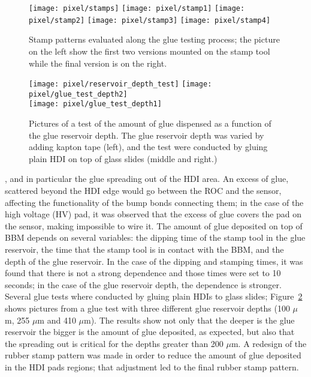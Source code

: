 \begin{figure}[!h]
  \centering  
  \texttt{[image: pixel/stamps]}
  \texttt{[image: pixel/stamp1]}
  \texttt{[image: pixel/stamp2]}
  \texttt{[image: pixel/stamp3]}
  \texttt{[image: pixel/stamp4]}
  \caption[Stamp patterns]{Stamp patterns evaluated along the glue testing process; the picture on the left show the first two versions mounted on the stamp tool while the final version is on the right.}\label{fig:stamp_pattern}
\end{figure}

\bit
  \begin{figure}[!h]
  \centering
  \texttt{[image: pixel/reservoir\_depth\_test]}
  \texttt{[image: pixel/glue\_test\_depth2]}\\
  \texttt{[image: pixel/glue\_test\_depth1]}
  \caption[Test of amount of glue deposited.]{Pictures of a test of the amount of glue dispensed as a function of the glue reservoir depth. The glue reservoir depth was varied by adding kapton tape (left), and the test were conducted by gluing plain HDI on top of glass slides (middle and right.)}\label{fig:glue_test_depth}
\end{figure}

\item {}, and in particular the glue spreading out of the HDI area. An excess of glue, scattered beyond the HDI edge would go between the ROC and the sensor, affecting the functionality of the bump bonds connecting them; in the case of the high voltage (HV) pad, it was observed that the excess of glue covers the pad on the sensor, making impossible to wire it. The amount of glue deposited on  top of BBM depends on several variables: the dipping time of the stamp tool in the glue reservoir, the time that the stamp tool is in contact with the BBM, and the depth of the glue reservoir. In the case of the dipping and stamping times, it was found that there is not a strong dependence and those times were set to 10 seconds; in the case of the glue reservoir depth, the dependence is stronger. Several glue tests where conducted by gluing plain HDIs to glass slides; Figure~\ref{fig:glue_test_depth} shows pictures from a glue test with three different glue reservoir depths (100 $\mu$m, 255 $\mu$m and 410 $\mu$m). The results show not only that the deeper is the glue reservoir the bigger is the amount of glue deposited, as expected, but also that the spreading out is critical for the depths greater than 200 $\mu$m. A redesign of the rubber stamp pattern was made in order to reduce the amount of glue deposited in the HDI pads regions; that adjustment led to the final rubber stamp pattern.

